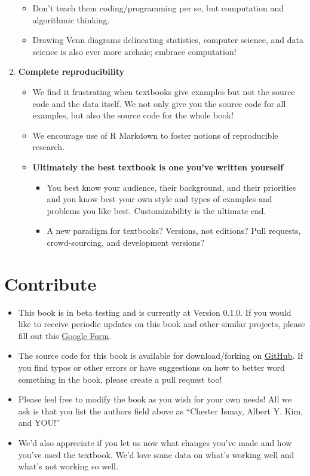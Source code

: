 \documentclass[]{tufte-book}
\providecommand{\tightlist}{%
  \setlength{\itemsep}{0pt}\setlength{\parskip}{0pt}}
\begin{document}
\begin{enumerate}
  \begin{itemize}
  \tightlist
  \item
    Don't teach them coding/programming per se, but computation and
    algorithmic thinking.
  \item
    Drawing Venn diagrams delineating statistics, computer science, and
    data science is also ever more archaic; embrace computation!
  \end{itemize}
\item
  \textbf{Complete reproducibility}

  \begin{itemize}
  \tightlist
  \item
    We find it frustrating when textbooks give examples but not the
    source code and the data itself. We not only give you the source
    code for all examples, but also the source code for the whole book!
  \item
    We encourage use of R Markdown to foster notions of reproducible
    research.
  \item
    \textbf{Ultimately the best textbook is one you've written yourself}

    \begin{itemize}
    \tightlist
    \item
      You best know your audience, their background, and their
      priorities and you know best your own style and types of examples
      and problems you like best. Customizability is the ultimate end.
    \item
      A new paradigm for textbooks? Versions, not editions? Pull
      requests, crowd-sourcing, and development versions?
    \end{itemize}
  \end{itemize}
\end{enumerate}

\section{Contribute}\label{contribute}

\begin{itemize}
\tightlist
\item
  This book is in beta testing and is currently at Version 0.1.0. If you
  would like to receive periodic updates on this book and other similar
  projects, please fill out this
  \href{https://goo.gl/forms/IxiwBeEnk72NxMMx2}{Google Form}.
\item
  The source code for this book is available for download/forking on
  \href{https://github.com/ismayc/moderndiver-book}{GitHub}. If you find
  typos or other errors or have suggestions on how to better word
  something in the book, please create a pull request too!
\item
  Please feel free to modify the book as you wish for your own needs!
  All we ask is that you list the authors field above as ``Chester
  Ismay, Albert Y. Kim, and YOU!''
\item
  We'd also appreciate if you let us now what changes you've made and
  how you've used the textbook. We'd love some data on what's working
  well and what's not working so well.
\end{itemize}
\end{document}
